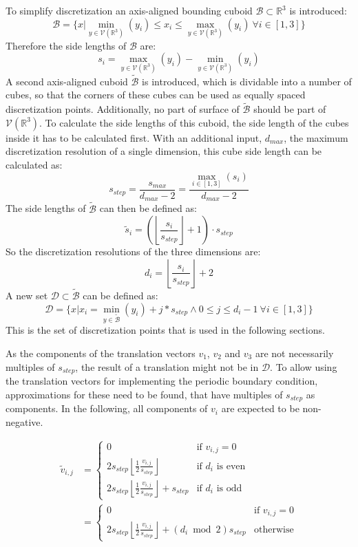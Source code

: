  To simplify discretization an axis-aligned bounding cuboid $\mathcal{B} \subset \mathbb{R}^3$ is introduced:
  \[
  \mathcal{B} = \{x | \min_{y \in \mathcal{V}(\mathbb{R}^3)}(y_i) \le x_i \le  \max_{y \in \mathcal{V}(\mathbb{R}^3)}(y_i) ~\forall i \in [1,3]\}
  \]
  Therefore the side lengths of $\mathcal{B}$ are: \[s_i = \max_{y \in \mathcal{V}(\mathbb{R}^3)}(y_i)-\min_{y \in \mathcal{V}(\mathbb{R}^3)}(y_i)\]
  A second axis-aligned cuboid $\mathcal{\tilde{B}}$ is introduced, which is dividable into a number of cubes, so that the corners of these cubes can be used as equally spaced  discretization points. Additionally, no part of surface of $\mathcal{\tilde{B}}$ should be part of $\mathcal{V}(\mathbb{R}^3)$. To calculate the side lengths of this cuboid, the side length of the cubes inside it has to be calculated first. With an additional input, $d_{max}$, the maximum discretization resolution of a single dimension, this cube side length can be calculated as:
\[
s_{step} = \frac{s_{max}}{d_{max}-2} = \frac{\max_{i \in [1,3]}(s_i)}{d_{max}-2}
\]
The side lengths of $\mathcal{\tilde{B}}$ can then be defined as:
\[
\tilde{s}_i = (\left\lfloor \frac{s_i}{s_{step}}\right\rfloor+1) \cdot s_{step}
\]
So the discretization resolutions of the three dimensions are:
\[
d_i = \left\lfloor \frac{s_i}{s_{step}}\right\rfloor+2
\]
A new set $\mathcal{D} \subset \mathcal{\tilde{B}}$ can be defined as:
\[
\mathcal{D} = \{x | x_i = \min_{y \in \mathcal{\tilde{B}}}(y_i)+j*s_{step} \land 0 \le j \le d_i-1~\forall i \in [1,3]\}
\]
This is the set of discretization points that is used in the following sections.

As the components of the translation vectors $v_1$, $v_2$ and $v_3$ are not necessarily multiples of $s_{step}$, the result of a translation might not be in $\mathcal{D}$. To allow using the translation vectors for implementing the periodic boundary condition, approximations for these need to be found, that have multiples of $s_{step}$ as components. In the following, all components of $v_i$ are expected to be non-negative.

\begin{align*}
\tilde{v}_{i,j} &= \begin{cases}0 & \text{if } v_{i,j} = 0\\
2 s_{step}\left\lfloor \frac{1}{2} \frac{v_{i,j}}{s_{step}}\right\rfloor & \text{if } d_i \text{ is even}\\
2 s_{step}\left\lfloor \frac{1}{2} \frac{v_{i,j}}{s_{step}}\right\rfloor + s_{step}& \text{if } d_i \text{ is odd}\end{cases}
\\&= \begin{cases}0 & \text{if } v_{i,j} = 0\\
2 s_{step}\left\lfloor \frac{1}{2} \frac{v_{i,j}}{s_{step}}\right\rfloor + (d_i \bmod 2) s_{step}& \text{otherwise}\end{cases}
\end{align*}
